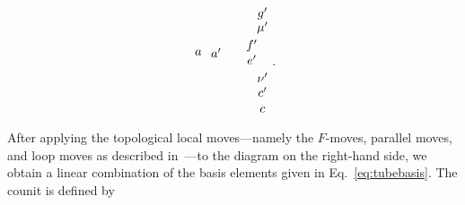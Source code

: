 \documentclass[a4paper,11pt]{article}
\theoremstyle{theorem}
\theoremstyle{remark}
\begin{document}
\begin{equation}
\begin{aligned}
\begin{tikzpicture}
                                      \node[line width=0.6pt, dashed, draw opacity=0.5] at (0.3,-1.6) {$c$};
        \node[line width=0.6pt, dashed, draw opacity=0.5] at (0.3,1.1) {$g'$};
        \node[line width=0.6pt, dashed, draw opacity=0.5] at (0.3,-1.1) {$c'$};
        \node[line width=0.6pt, dashed, draw opacity=0.5] at (-1,0) {$a'$};
        \node[line width=0.6pt, dashed, draw opacity=0.5] at (0.3,-0.7) {$\nu'$};
        \node[line width=0.6pt, dashed, draw opacity=0.5] at (0,-0.2) {$e'$};
        \node[line width=0.6pt, dashed, draw opacity=0.5] at (0,0.2) {$f'$};
        \node[line width=0.6pt, dashed, draw opacity=0.5] at (0.3,0.7) {$\mu'$};
                \node[line width=0.6pt, dashed, draw opacity=0.5] at (-1.5,0) {$a$};
    \end{tikzpicture}
\end{aligned}.
\end{equation}
After applying the topological local moves—namely the \( F \)-moves, parallel moves, and loop moves as described in~\cite{jia2024weakTube}—to the diagram on the right-hand side, we obtain a linear combination of the basis elements given in Eq.~\eqref{eq:tubebasis}.
The counit is defined by
\end{document}
